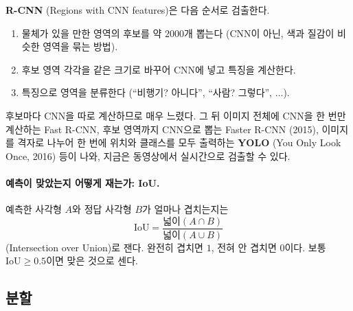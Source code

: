 \documentclass[11pt,a4paper]{article}
\begin{document}
\textbf{R-CNN} (Regions with CNN features)은 다음 순서로 검출한다.
\begin{enumerate}[leftmargin=1.8em]
\item 물체가 있을 만한 영역의 후보를 약 $2000$개 뽑는다 (CNN이 아닌, 색과 질감이 비슷한 영역을 묶는 방법).
\item 후보 영역 각각을 같은 크기로 바꾸어 CNN에 넣고 특징을 계산한다.
\item 특징으로 영역을 분류한다 (``비행기? 아니다'', ``사람? 그렇다'', $\ldots$).
\end{enumerate}
후보마다 CNN을 따로 계산하므로 매우 느렸다. 그 뒤 이미지 전체에 CNN을 한 번만 계산하는 Fast R-CNN,
후보 영역까지 CNN으로 뽑는 Faster R-CNN (2015),
이미지를 격자로 나누어 한 번에 위치와 클래스를 모두 출력하는 \textbf{YOLO} (You Only Look Once, 2016) 등이 나와,
지금은 동영상에서 실시간으로 검출할 수 있다.

\paragraph{예측이 맞았는지 어떻게 재는가: IoU.}
예측한 사각형 $A$와 정답 사각형 $B$가 얼마나 겹치는지는
\[
\text{IoU}=\frac{\text{넓이}(A\cap B)}{\text{넓이}(A\cup B)}
\]
(Intersection over Union)로 잰다. 완전히 겹치면 $1$, 전혀 안 겹치면 $0$이다. 보통 $\text{IoU}\ge0.5$이면 맞은 것으로 센다.

\begin{center}
\begin{minipage}{\textwidth}\centering
{}
\end{minipage}
\end{center}

\subsection{분할}\label{sec:segmentation}
\end{document}
